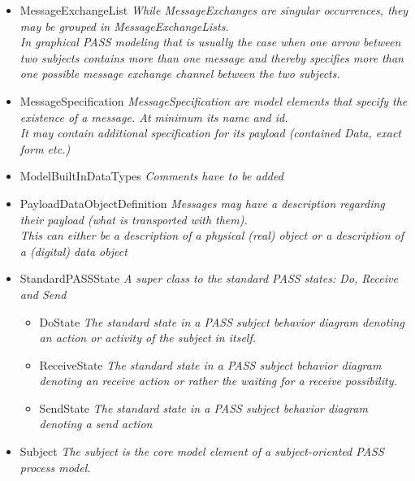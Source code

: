 \begin{itemize}
\begin{itemize}
\begin{itemize}
{		These are the typical conditions defined by Send transitions.}
	\end{itemize} 
	\item MessageExchangeList \linebreak \textit{While MessageExchanges are singular occurrences, they may be grouped in MessageExchangeLists.\\
	In graphical PASS modeling that is usually the case when one arrow between two subjects contains more than one message and thereby specifies more than one possible message exchange channel between the two subjects.}
	\item MessageSpecification \linebreak \textit{MessageSpecification are model elements that specify the existence of a message. At minimum its name and id.\\
	It may contain additional specification for its payload (contained Data, exact form etc.)}
	\item ModelBuiltInDataTypes \linebreak \textit{Comments have to be added}
	\item PayloadDataObjectDefinition \linebreak \textit{Messages may have a description regarding their payload (what is transported with them).\\
	This can either be a description of a physical (real) object or a description of a (digital) data object}
	\item StandardPASSState \linebreak \textit{A super class to the standard PASS states: Do, Receive and Send}
	\begin{itemize}
		\item DoState \linebreak \textit{The standard state in a PASS subject behavior diagram denoting an action or activity of the subject in itself.}
		\item ReceiveState \linebreak \textit{The standard state in a PASS subject behavior diagram denoting an receive action or rather the waiting for a receive possibility.}
		\item SendState \linebreak \textit{The standard state in a PASS subject behavior diagram denoting a send action}
	\end{itemize}
	\item Subject \linebreak \textit{The subject is the core model element of a subject-oriented PASS process model.}

\end{itemize}
\end{itemize}
